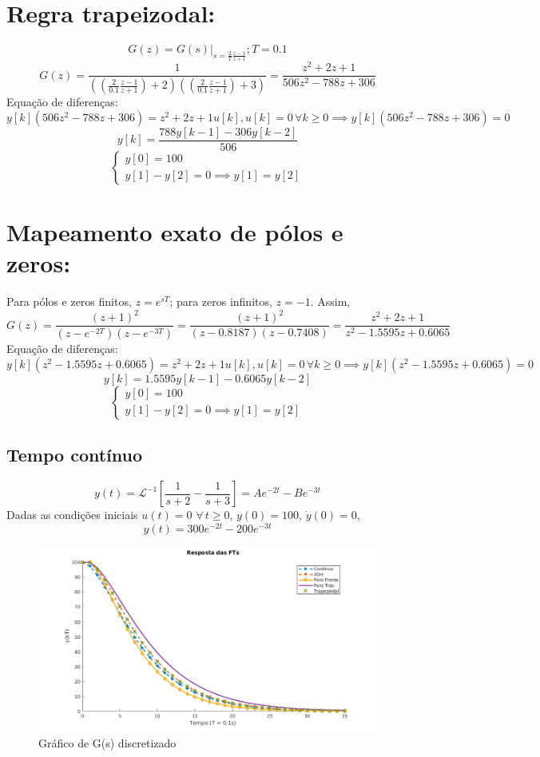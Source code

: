 \documentclass{article}
\begin{document}
\section{Regra trapeizodal:}
    \[ G(z) = \left.G(s)\right|_{s=\frac 2 T\frac{z-1}{z+1}}; T = 0.1 \]
    \[ G(z) = \frac{1}{\left( \left( \frac{2}{0.1}\frac{z-1}{z+1} \right) +2 \right)\left(\left( \frac{2}{0.1}\frac{z-1}{z+1}\right) +3 \right)} = \frac{z^2 + 2z +1}{506z^2 - 788z + 306} \]
    {Equação de diferenças:}
    \[ y[k](506z^2 - 788z + 306) = z^2 + 2z + 1 u[k], u[k] = 0 \,\forall k \geq 0 \implies y[k](506z^2 - 788z + 306) = 0 \]
    \[ y[k] = \frac{788 y[k-1] - 306 y[k-2]}{506} \]
    \[ \begin{cases}
        y[0] = 100\\
        y[1] - y[2] = 0 \implies y[1] = y[2]
    \end{cases}\]


\section{Mapeamento exato de pólos e zeros:}
    {Para pólos e zeros finitos, $z = e^{sT}$; para zeros infinitos, $z = -1$. Assim,}
    \[ G(z) = \frac{(z+1)^2}{(z-e^{-2T})(z-e^{-3T})} = \frac{(z+1)^2}{(z - 0.8187)(z - 0.7408)} = \frac{z^2 + 2z +1}{z^2 - 1.5595z + 0.6065} \]
    {Equação de diferenças:}
    \[ y[k](z^2 - 1.5595z + 0.6065) = z^2 + 2z +1 u[k], u[k] = 0 \,\forall k \geq 0 \implies y[k](z^2 - 1.5595z + 0.6065) = 0 \]
    \[ y[k] = 1.5595 y[k-1] - 0.6065 y[k-2] \]
    \[ \begin{cases}
        y[0] = 100\\
        y[1] - y[2] = 0 \implies y[1] = y[2]
    \end{cases}\]


\subsection*{Tempo contínuo}
    \[ y(t) = \mathcal{L}^{-1}\left[ \frac{1}{s+2} - \frac{1}{s+3} \right] = Ae^{-2t} - Be^{-3t} \]
    {Dadas as condições iniciais $u(t) = 0$ $\forall\, t \geq 0$, $y(0) = 100$, $\dot{y}(0) = 0$,}
    \[ y(t) = 300e^{-2t} - 200e^{-3t} \]


    \begin{figure}[H]
        \centering
            \includegraphics[width=1\linewidth]{images/discretizado.png}
            \caption{Gráfico de G(s) discretizado}\label{fig:discretizado}
    \end{figure}
\end{document}
